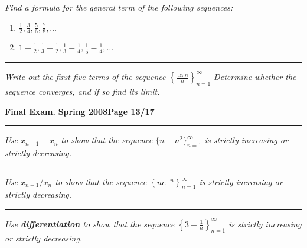 \documentclass[12pt]{article}
\begin{document}
{\bigskip
{\problem[10 pts] \em  Find a formula for the general term of the following sequences:} 
\begin{enumerate}
\item $\displaystyle{\frac{1}{2}, \frac{3}{4}, \frac{5}{6}, \frac{7}{8}, \dotsc}$
\bigskip
\begin{flushright}
\end{flushright}
\item $\displaystyle{1-\frac{1}{2}, \frac{1}{3} - \frac{1}{2}, \frac{1}{3} - \frac{1}{4}, \frac{1}{5}-\frac{1}{4}, \dotsc}$
\vspace{3cm}
\begin{flushright}
\end{flushright}
\end{enumerate}
\hrule
{\problem[10pts] \em Write out the first five terms of the sequence $\left\{ \displaystyle{\frac{\ln n}{n}} \right\}_{n=1}^\infty$ \newline Determine whether the sequence converges, and if so find its limit.
\vspace{7cm}
\begin{flushright}
\end{flushright}
\newpage


\hfill{\large\bf Final Exam.}\hfill{\large\bf
  Spring 2008}\hfill{\large\bf Page 13/17}\hrule

\bigskip
{\problem[5 pts] \em Use $x_{n+1}-x_n$ to show that the sequence $\big\{ n-n^2 \big\}_{n=1}^\infty$ is strictly increasing or strictly decreasing.}
\vspace{6.5cm}
\hrule
{\problem[5 pts] \em Use $x_{n+1}/x_n$ to show that the sequence $\left\{ \displaystyle{ne^{-n}} \right\}_{n=1}^\infty$ is strictly increasing or strictly decreasing.}
\vspace{6.5cm}
\hrule
{\problem[5 pts] \em Use \textbf{differentiation} to show that the sequence $\left\{ \displaystyle{3 - \frac{1}{n}} \right\}_{n=1}^\infty$ is strictly increasing or strictly decreasing.}
\newpage

}}
\end{document}

